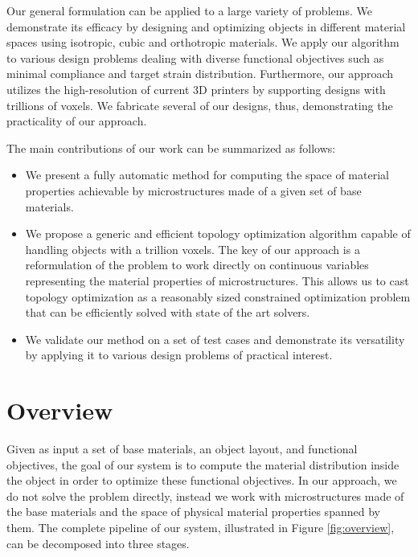 Our general formulation can be applied to a large variety of problems. We demonstrate its efficacy by designing and optimizing objects in different material spaces using isotropic, cubic and orthotropic materials. We apply our algorithm to various design problems dealing with diverse functional objectives such as minimal compliance and target strain distribution. Furthermore, our approach utilizes the high-resolution of current 3D printers by supporting designs with trillions of voxels. We fabricate several of our designs, thus, demonstrating the practicality of our approach.

The main contributions of our work can be summarized as follows:
\begin{itemize}
	\item We present a fully automatic method for computing the space of material properties achievable by microstructures made of a given set of base materials.
	\item We propose a generic and efficient topology optimization algorithm capable of handling objects with a trillion voxels. The key of our approach is a reformulation of the problem to work directly on continuous variables representing the material properties of microstructures. This allows us to cast topology optimization as a reasonably sized constrained optimization problem that can be efficiently solved with state of the art solvers.
	\item We validate our method on a set of test cases and demonstrate its versatility by applying it to various design problems of practical interest.
\end{itemize}
\section{Overview}
Given as input a set of base materials, an object layout, and functional objectives, the goal of our system is to compute the material distribution inside the object in order to optimize these functional objectives. In our approach, we do not solve the problem directly, instead we work with microstructures made of the base materials and the space of physical material properties spanned by them. The complete pipeline of our system, illustrated in Figure \ref{fig:overview}, can be decomposed into three stages.


